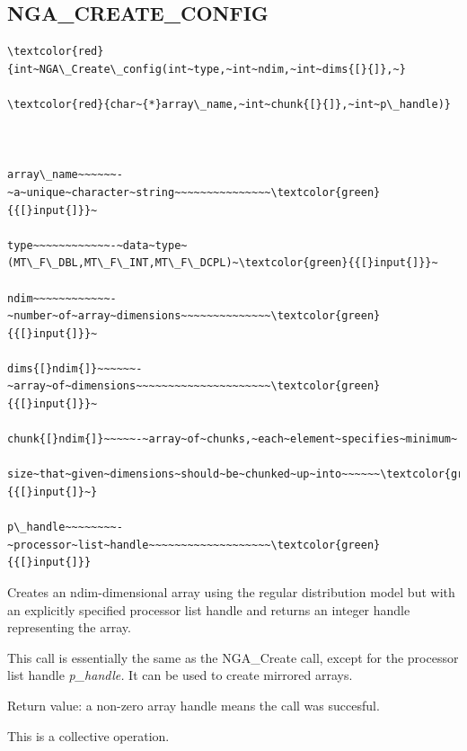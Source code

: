 \subsection*{\label{sub:NGA_CREATE_CONFIG}NGA\_CREATE\_CONFIG}
\begin{verbatim}
\textcolor{red}{int~NGA\_Create\_config(int~type,~int~ndim,~int~dims{[}{]},~}

\textcolor{red}{char~{*}array\_name,~int~chunk{[}{]},~int~p\_handle)}



array\_name~~~~~~-~a~unique~character~string~~~~~~~~~~~~~~~\textcolor{green}{{[}input{]}}~

type~~~~~~~~~~~~-~data~type~(MT\_F\_DBL,MT\_F\_INT,MT\_F\_DCPL)~\textcolor{green}{{[}input{]}}~

ndim~~~~~~~~~~~~-~number~of~array~dimensions~~~~~~~~~~~~~~\textcolor{green}{{[}input{]}}~

dims{[}ndim{]}~~~~~~-~array~of~dimensions~~~~~~~~~~~~~~~~~~~~~\textcolor{green}{{[}input{]}}~

chunk{[}ndim{]}~~~~~-~array~of~chunks,~each~element~specifies~minimum~

size~that~given~dimensions~should~be~chunked~up~into~~~~~~\textcolor{green}{{[}input{]}~}

p\_handle~~~~~~~~-~processor~list~handle~~~~~~~~~~~~~~~~~~~\textcolor{green}{{[}input{]}}
\end{verbatim}
Creates an ndim-dimensional array using the regular distribution model
but with an explicitly specified processor list handle and returns
an integer handle representing the array.

This call is essentially the same as the NGA\_Create call, except
for the processor list handle \emph{p\_handle.} It can be used to
create mirrored arrays.

Return value: a non-zero array handle means the call was succesful. 

This is a collective operation. 


